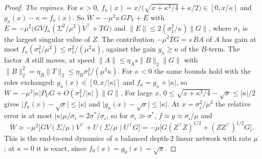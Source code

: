 \begin{proof}
\emph{The regimes.} For $\kappa>0$, $f_\kappa(x)=x/\big(\sqrt{x+\kappa^2/4}+\kappa/2\big)\in[0,x/\kappa]$ and
$g_\kappa(x)-\kappa=f_\kappa(x)$. So $\dot W=-\mu^2\kappa\,GP_V+E$ with $E=-\mu^2\big(GVf_\kappa(\Sigma^2/\mu^2)V^\top+TG\big)$
and $\lVert E\rVert\le2(\sigma_1^2/\kappa)\lVert G\rVert$, where $\sigma_1$ is the largest singular value of $Z$. The
contribution $-\mu^2TG=s\,B\dot A$ of $A$ has gain at most $f_\kappa(\sigma_1^2/\mu^2)\le\sigma_1^2/(\mu^2\kappa)$, against
the gain $g_\kappa\ge\kappa$ of the $B$-term. The factor $A$ still moves, at speed
$\lVert\dot A\rVert\le\eta_As\lVert B\rVert_2\lVert G\rVert$ with $\lVert B\rVert_2^2=\eta_B\lVert T\rVert_2\le\eta_B\sigma_1^2/(\mu^2\kappa)$.
For $\kappa<0$ the same bounds hold with the roles exchanged: $g_\kappa(x)\in[0,x/\lvert\kappa\rvert]$ and
$f_\kappa=g_\kappa+\lvert\kappa\rvert$, so $\dot W=-\mu^2\lvert\kappa\rvert P_UG+O(\sigma_1^2/\lvert\kappa\rvert)\lVert G\rVert$.
For large $x$, $0\le\sqrt{x+\kappa^2/4}-\sqrt x\le\lvert\kappa\rvert/2$ gives $\lvert f_\kappa(x)-\sqrt x\rvert\le\lvert\kappa\rvert$
and $\lvert g_\kappa(x)-\sqrt x\rvert\le\lvert\kappa\rvert$. At $x=\sigma_i^2/\mu^2$ the relative error is at most
$\lvert\kappa\rvert\mu/\sigma_i=2\sigma^*/\sigma_i$, so for $\sigma_i\gg\sigma^*$, $f\approx g\approx\sigma_i/\mu$ and
\[\dot W\approx-\mu^2\big[GV(\Sigma/\mu)V^\top+U(\Sigma/\mu)U^\top G\big]=-\mu\big[G(Z^\top Z)^{1/2}+(ZZ^\top)^{1/2}G\big].\]
This is the end-to-end dynamics of a balanced depth-2 linear network with rate $\mu$ \citep[Thm.~1 with
$N=2$]{arora2018optimization}; at $\kappa=0$ it is exact, since $f_0(x)=g_0(x)=\sqrt x$.


\end{proof}

